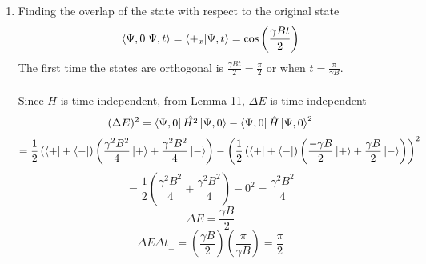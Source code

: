 \begin{sol}
\begin{enumerate}[label=\textbf{(\alph*)}]
\item
Finding the overlap of the state with respect to the original state
\begin{equation}
	\braket{\Psi,0}{\Psi,t}=\braket{+_x}{\Psi,t}=\cos\left(\frac{\gamma Bt}{2}\right)
\end{equation} 
The first time the states are orthogonal is $\displaystyle{\frac{\gamma Bt}{2}=\frac{\pi}{2}}$ or when $\displaystyle{t=\frac{\pi}{\gamma B}}$.\\\\
Since $H$ is time independent, from Lemma 11, $\Delta E$ is time independent
\begin{equation}
	(\Delta E)^2=\bra{\Psi,0}\hat {H^2}\ket{\Psi,0}-\bra{\Psi,0}\hat H\ket{\Psi,0}^2
\end{equation}
\begin{equation}
	=\frac{1}{2}\left(\bra++\bra-\right)\left(\frac{\gamma^2 B^2}{4}\ket++\frac{\gamma^2 B^2}{4}\ket-\right)
-\left(\frac{1}{2}\left(\bra++\bra-\right)\left(\frac{-\gamma B}{2}\ket++\frac{\gamma B}{2}\ket-\right)\right)^2
\end{equation}
\begin{equation}
	=\frac{1}{2}\left(\frac{\gamma^2 B^2}{4}+\frac{\gamma^2 B^2}{4}\right)-0^2=\frac{\gamma^2 B^2}{4}
\end{equation} 
\begin{equation}
	\Delta E=\frac{\gamma B}{2}
\end{equation} 
\begin{equation}
	\Delta E\Delta t_\perp=\left(\frac{\gamma B}{2}\right)\left(\frac{\pi}{\gamma B}\right)=\frac{\pi}{2}
\end{equation} 

 \end{enumerate}
\end{sol}